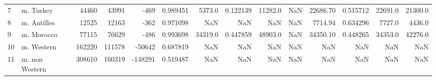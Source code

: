 \begin{tabular}{llrrrrrrrrrrrr}
7  &          m. Turkey &   44460 &   43991 &         -469 &   0.989451 &                        5373.0 &                  0.122139 &                          11282.0 &         NaN &         22686.70 &                         0.515712 &            22691.0 &               21300.0 \\
8  &        m. Antilles &   12525 &   12163 &         -362 &   0.971098 &                           NaN &                       NaN &                              NaN &         NaN &          7714.94 &                         0.634296 &             7727.0 &                4436.0 \\
9  &         m. Morocco &   77115 &   76629 &         -486 &   0.993698 &                       34319.0 &                  0.447859 &                          48903.0 &         NaN &         34350.10 &                         0.448265 &            34353.0 &               42276.0 \\
10 &         m. Western &  162220 &  111578 &       -50642 &   0.687819 &                           NaN &                       NaN &                              NaN &         NaN &              NaN &                              NaN &                NaN &                   NaN \\
11 &     m. non Western &  308610 &  160319 &      -148291 &   0.519487 &                           NaN &                       NaN &                              NaN &         NaN &              NaN &                              NaN &                NaN &                   NaN \\
\bottomrule
\end{tabular}
